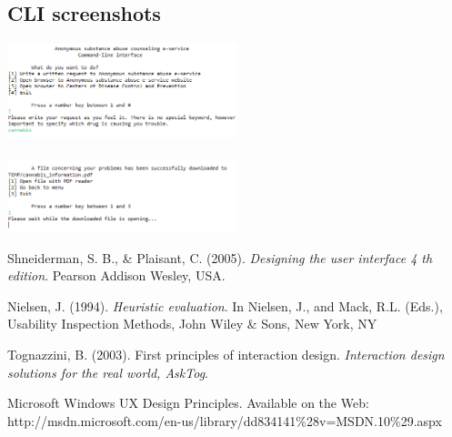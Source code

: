 \documentclass[a4paper,12pt, twocolumn]{article}
\begin{document}
\subsection{CLI screenshots}

\begin{center}
\includegraphics[width=0.5\textwidth]{images/cli_screen_1.png}
\label{cli_1}
~\\~\\

\includegraphics[width=0.5\textwidth]{images/cli_screen_2.png}
\label{cli_1}
\end{center}




\begin{thebibliography}{9}

  Shneiderman, S. B., \& Plaisant, C. (2005). \emph{Designing the user interface 4 th edition}. Pearson Addison Wesley, USA.

  Nielsen, J. (1994). \emph{Heuristic evaluation}. In Nielsen, J., and Mack, R.L. (Eds.), Usability Inspection Methods, John Wiley \& Sons, New York, NY

  Tognazzini, B. (2003). First principles of interaction design. \emph{Interaction design solutions for the real world, AskTog}.
  
 Microsoft Windows UX Design Principles. Available on the Web: http://msdn.microsoft.com/en-us/library/dd834141\%28v=MSDN.10\%29.aspx

\end{thebibliography}
\end{document}
